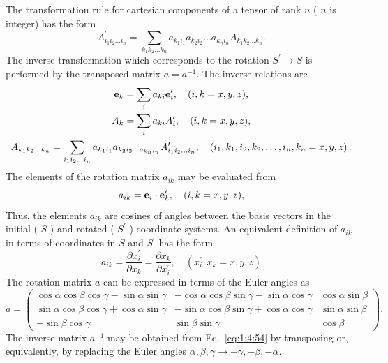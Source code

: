The transformation rule for cartesian components of a tensor of rank \(n\) ( \(n\) is integer) has the form
\begin{equation}
A_{i_{1} i_{2} \ldots i_{n}}^{\prime}=\sum_{k_{1} k_{2} \ldots k_{n}} a_{k_{1} i_{1}} a_{k_{2} i_{2}} \ldots a_{k_{n} i_{n}} A_{k_{1} k_{2} \ldots k_{n}} . \label{eq:1:4:48}
\end{equation}
The inverse transformation which corresponds to the rotation \(S^{\prime} \rightarrow S\) is performed by the transposed matrix \(\tilde{a}=a^{-1}\). The inverse relations are
\begin{gather}
\mathbf{e}_{k}=\sum_{i} a_{k i} \mathbf{e}_{i}^{\prime}, \quad(i, k=x, y, z) , \label{eq:1:4:49}\\
A_{k}=\sum_{i} a_{k i} A_{i}^{\prime}, \quad(i, k=x, y, z) , \label{eq:1:4:50}\\
A_{k_{1} k_{2} \ldots k_{n}}=\sum_{i_{1} i_{2} \ldots i_{n}} a_{k_{1} i_{1}} a_{k_{2} i_{2} \ldots a_{k_{n} i_{n}}} A_{i_{1} i_{2} \ldots i_{n}}^{\prime}, \quad\left(i_{1}, k_{1}, i_{2}, k_{2}, \ldots, i_{n}, k_{n}=x, y, z\right). \label{eq:1:4:51}
\end{gather}
The elements of the rotation matrix \(a_{i k}\) may be evaluated from
\begin{equation}
a_{i k}=\mathbf{e}_{i} \cdot \mathbf{e}_{k}^{\prime}, \quad(i, k=x, y, z), \label{eq:1:4:52}
\end{equation}
Thus, the elements \(a_{i k}\) are cosines of angles between the basis vectors in the initial ( \(S\) ) and rotated ( \(S^{\prime}\) ) coordinate systems. An equivalent definition of \(a_{i k}\) in terms of coordinates in \(S\) and \(S^{\prime}\) has the form
\begin{equation}
a_{i k}=\frac{\partial x_{i}^{\prime}}{\partial x_{k}}=\frac{\partial x_{k}}{\partial x_{i}^{\prime}}, \quad\left(x_{i}^{\prime}, x_{k}=x, y, z\right) \label{eq:1:4:53}
\end{equation}
The rotation matrix \(a\) can be expressed in terms of the Euler angles as
\begin{equation}
a=\begin{pmatrix}
\cos \alpha \cos \beta \cos \gamma-\sin \alpha \sin \gamma & -\cos \alpha \cos \beta \sin \gamma-\sin \alpha \cos \gamma & \cos \alpha \sin \beta  \label{eq:1:4:54}\\
\sin \alpha \cos \beta \cos \gamma+\cos \alpha \sin \gamma & -\sin \alpha \cos \beta \sin \gamma+\cos \alpha \cos \gamma & \sin \alpha \sin \beta \\
-\sin \beta \cos \gamma & \sin \beta \sin \gamma & \cos \beta
\end{pmatrix}.
\end{equation}
The inverse matrix \(a^{-1}\) may be obtained from Eq.~\eqref{eq:1:4:54} by transposing or, equivalently, by replacing the Euler angles \(\alpha, \beta, \gamma \rightarrow-\gamma,-\beta,-\alpha\).


